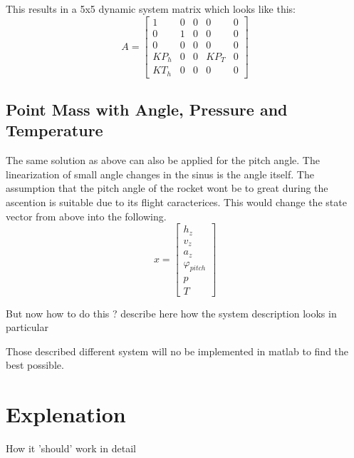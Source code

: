   This results in a 5x5 dynamic system matrix which looks like this:
  $$ A = \begin{bmatrix}
         1    & 0 & 0 & 0    & 0 \\
         0    & 1 & 0 & 0    & 0 \\
         0    & 0 & 0 & 0    & 0 \\
         KP_h & 0 & 0 & KP_T & 0 \\
         KT_h & 0 & 0 & 0    & 0 
        \end{bmatrix} $$
  
  \subsection{Point Mass with Angle, Pressure and Temperature}
  The same solution as above can also be applied for the pitch angle. The linearization of small angle changes in the sinus is the angle itself.
  The assumption that the pitch angle of the rocket wont be to great during the ascention is suitable due to its flight caracterices.
  This would change the state vector from above into the following.
      $$ x = \begin{bmatrix}
  h_z\\
  v_z\\
  a_z\\
  \varphi_{pitch}\\
  p\\
  T
  \end{bmatrix} $$
  
  But now how to do this ?
  describe here how the system description looks in particular 
  
  
  Those described different system will no be implemented in matlab to find the best possible.
  
  \section{Explenation}
  How it 'should' work in detail
  
